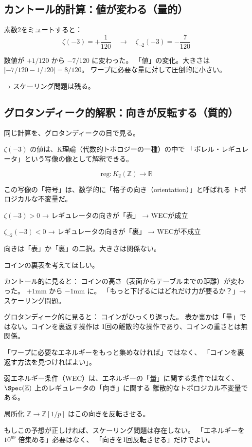 \documentclass[12pt,a4paper]{article}
\begin{document}
\subsection{カントール的計算：値が変わる（量的）}

素数2をミュートすると：
$$
\zeta(-3) = +\frac{1}{120} \quad\longrightarrow\quad \zeta_{\neg 2}(-3) = -\frac{7}{120}
$$

数値が $+1/120$ から $-7/120$ に変わった。
「値」の変化。大きさは $|{-7/120 - 1/120}| = 8/120$。
ワープに必要な量に対して圧倒的に小さい。

→ スケーリング問題は残る。

\subsection{グロタンディーク的解釈：向きが反転する（質的）}

同じ計算を、グロタンディークの目で見る。

$\zeta(-3)$ の値は、K理論（代数的トポロジーの一種）の中で
「ボレル・レギュレータ」という写像の像として解釈できる。

$$
\text{reg}: K_2(\mathbb{Z}) \to \mathbb{R}
$$

この写像の「符号」は、数学的に「格子の向き（orientation）」と呼ばれる
トポロジカルな不変量だ。

\begin{keybox}[レギュレータの向き]
$\zeta(-3) > 0$ → レギュレータの向きが「表」 → WECが成立

$\zeta_{\neg 2}(-3) < 0$ → レギュレータの向きが「裏」 → WECが不成立

向きは「表」か「裏」の二択。大きさは関係ない。
\end{keybox}

\begin{analogybox}
コインの裏表を考えてほしい。

カントール的に見ると：
コインの高さ（表面からテーブルまでの距離）が変わった。
$+1\text{mm}$ から $-1\text{mm}$ に。
「もっと下げるにはどれだけ力が要るか？」→ スケーリング問題。

グロタンディーク的に見ると：
コインがひっくり返った。
表か裏かは「量」ではない。コインを裏返す操作は
1回の離散的な操作であり、コインの重さとは無関係。

「ワープに必要なエネルギーをもっと集めなければ」ではなく、
「コインを裏返す方法を見つければよい」。
\end{analogybox}

\begin{keybox}[論文Bの核心的主張（予想）]
弱エネルギー条件（WEC）は、エネルギーの「量」に関する条件ではなく、
$\Spec(\mathbb{Z})$ 上のレギュレータの「向き」に関する
離散的なトポロジカル不変量である。

局所化 $\mathbb{Z} \to \mathbb{Z}[1/p]$ はこの向きを反転させる。

もしこの予想が正しければ、スケーリング問題は存在しない。
「エネルギーを $10^{69}$ 倍集める」必要はなく、
「向きを1回反転させる」だけでよい。
\end{keybox}
\end{document}
